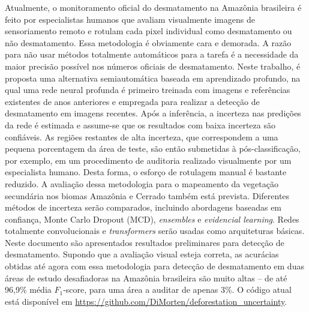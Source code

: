 {Atualmente, o monitoramento oficial do desmatamento na Amazônia brasileira é feito por especialistas humanos que avaliam visualmente imagens de sensoriamento remoto e rotulam cada pixel individual como desmatamento ou não desmatamento. Essa metodologia é obviamente cara e demorada. A razão para não usar métodos totalmente automáticos para a tarefa é a necessidade da maior precisão possível nos números oficiais de desmatamento. Neste trabalho, é proposta uma alternativa semiautomática baseada em aprendizado profundo, na qual uma rede neural profunda é primeiro treinada com imagens e referências existentes de anos anteriores e empregada para realizar a detecção de desmatamento em imagens recentes. Após a inferência, a incerteza nas predições da rede é estimada e assume-se que os resultados com baixa incerteza são confiáveis. As regiões restantes de alta incerteza, que correspondem a uma pequena porcentagem da área de teste, são então submetidas à pós-classificação, por exemplo, em um procedimento de auditoria realizado visualmente por um especialista humano. Desta forma, o esforço de rotulagem manual é bastante reduzido. A avaliação dessa metodologia para o mapeamento da vegetação secundária nos biomas Amazônia e Cerrado também está prevista. Diferentes métodos de incerteza serão comparados, incluindo abordagens baseadas em confiança, Monte Carlo Dropout (MCD), \textit{ensembles} e \textit{evidencial learning}. Redes totalmente convolucionais e \textit{transformers} serão usadas como arquiteturas básicas. Neste documento são apresentados resultados preliminares para detecção de desmatamento. Supondo que a avaliação visual esteja correta, as acurácias obtidas até agora com essa metodologia para detecção de desmatamento em duas áreas de estudo desafiadoras na Amazônia brasileira são muito altas -- de até 96,9\% média $F_1$-score, para uma área a auditar de apenas 3\%. O código atual está disponível em \url{https://github.com/DiMorten/deforestation_uncertainty}.
}
